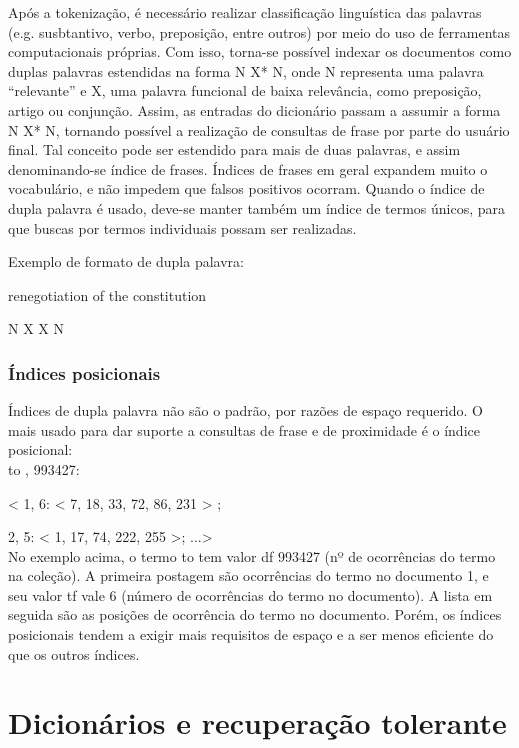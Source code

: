 Após a tokenização, é necessário realizar classificação linguística das palavras (e.g. susbtantivo, verbo, preposição, entre outros) por meio do uso de ferramentas computacionais próprias. Com isso, torna-se possível indexar os documentos como duplas palavras estendidas na forma N X* N, onde N representa uma palavra “relevante” e X, uma palavra funcional de baixa relevância, como preposição, artigo ou conjunção. Assim, as entradas do dicionário passam a assumir a forma N X* N, tornando possível a realização de consultas de frase por parte do usuário final. Tal conceito pode ser estendido para mais de duas palavras, e assim denominando-se índice de frases. Índices de frases em geral expandem muito o vocabulário, e não impedem que falsos positivos ocorram. Quando o índice de dupla palavra é usado, deve-se manter também um índice de termos únicos, para que buscas por termos individuais possam ser realizadas.
 
Exemplo de formato de dupla palavra:

renegotiation of the constitution

N X X N

\subsubsection{Índices posicionais}

Índices de dupla palavra não são o padrão, por razões de espaço requerido. O mais usado para dar suporte a consultas de frase e de proximidade é o índice posicional: \\

to , 993427:

< 1, 6: < 7, 18, 33, 72, 86, 231 > ;

\hspace{0.4cm}2, 5: < 1, 17, 74, 222, 255 >; ...>\\

No exemplo acima, o termo to tem valor df 993427 (nº de ocorrências do termo na coleção). A primeira postagem são ocorrências do termo no documento 1, e seu valor tf vale 6 (número de ocorrências do termo no documento). A lista em seguida são as posições de ocorrência do termo no documento. Porém, os índices posicionais tendem a exigir mais requisitos de espaço e a ser menos eficiente do que os outros índices.

\section{Dicionários e recuperação tolerante}
\label{sec:dicionarios}

